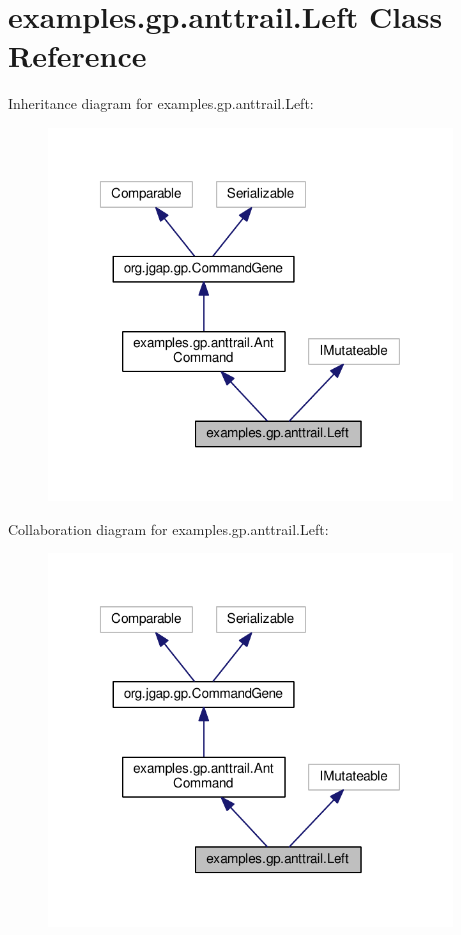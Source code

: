 \hypertarget{classexamples_1_1gp_1_1anttrail_1_1_left}{\section{examples.\-gp.\-anttrail.\-Left Class Reference}
\label{classexamples_1_1gp_1_1anttrail_1_1_left}
}


Inheritance diagram for examples.\-gp.\-anttrail.\-Left\-:
\nopagebreak
\begin{figure}[H]
\begin{center}
\leavevmode
\includegraphics[width=304pt]{classexamples_1_1gp_1_1anttrail_1_1_left__inherit__graph}
\end{center}
\end{figure}


Collaboration diagram for examples.\-gp.\-anttrail.\-Left\-:
\nopagebreak
\begin{figure}[H]
\begin{center}
\leavevmode
\includegraphics[width=304pt]{classexamples_1_1gp_1_1anttrail_1_1_left__coll__graph}
\end{center}
\end{figure}
